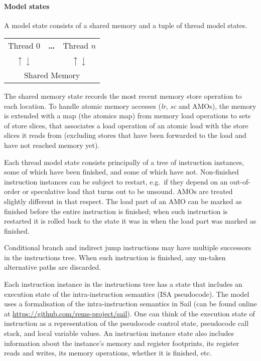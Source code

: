 \paragraph{Model states}
A model state consists of a shared memory and a tuple of thread model states.
\begin{center}
\sffamily
\begin{tabular}{ccc}
\cline{1-1}\cline{3-3}
\multicolumn{1}{|c|}{Thread 0} & \bf \dots & \multicolumn{1}{|c|}{Thread $n$} \\
\cline{1-1}\cline{3-3}
$\big\uparrow$ $\big\downarrow$ & & $\big\uparrow$ $\big\downarrow$ \\
\hline
\multicolumn{3}{|c|}{Shared Memory} \\
\hline
\end{tabular}
\end{center}
The shared memory state records the most recent memory store operation to each location.
To handle atomic memory accesses ({\em  lr}, {\em sc} and AMOs), the memory is extended with a map (the atomics map) from memory load operations to sets of store slices, that associates a load operation of an atomic load with the store slices it reads from (excluding stores that have been forwarded to the load and have not reached memory yet).

Each thread model state consists principally of a tree of instruction instances, some of which have been finished, and some of which have not.
Non-finished instruction instances can be subject to restart, e.g.~if they depend on an out-of-order or speculative load that turns out to be unsound.
AMOs are treated slightly different in that respect.
The load part of an AMO can be marked as finished before the entire instruction is finished; when such instruction is restarted it is rolled back to the state it was in when the load part was marked as finished.

Conditional branch and indirect jump instructions may have multiple successors in the instructions tree.
When such instruction is finished, any un-taken alternative paths are discarded.

Each instruction instance in the instructions tree has a state that includes an execution state of the intra-instruction semantics (ISA pseudocode).
The model uses a formalisation of the intra-instruction semantics in Sail (can be found online at \url{https://github.com/rems-project/sail}).
One can think of the execution state of instruction as a representation of the pseudocode control state, pseudocode call stack, and local variable values.
An instruction instance state also includes information about the instance's memory and register footprints, its register reads and writes, its memory operations, whether it is finished, etc.

